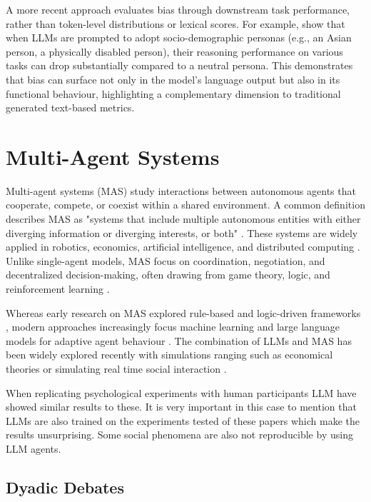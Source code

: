 A more recent approach evaluates bias through downstream task performance, rather than token-level distributions or lexical scores.  
For example, \citet{gupta2023bias} show that when LLMs are prompted to adopt socio-demographic personas (e.g., an Asian person, a physically disabled person), their reasoning performance on various tasks can drop substantially compared to a neutral persona. This demonstrates that bias can surface not only in the model’s language output but also in its functional behaviour, highlighting a complementary dimension to traditional generated text-based metrics.




\section{Multi-Agent Systems} 

Multi-agent systems (MAS) study interactions between autonomous agents that cooperate, compete, or coexist within a shared environment. A common definition describes MAS as "systems that include multiple autonomous entities with either diverging information or diverging interests, or both" \cite[p.xiii]{shoham2008multiagent}. These systems are widely applied in robotics, economics, artificial intelligence, and distributed computing \citep{wooldridge2009introduction}. Unlike single-agent models, MAS focus on coordination, negotiation, and decentralized decision-making, often drawing from game theory, logic, and reinforcement learning \citep{stone2010ad}.

Whereas early research on MAS explored rule-based and logic-driven frameworks \citep{shoham2008multiagent}, modern approaches increasingly focus machine learning and large language models for adaptive agent behaviour \citep{baker2019emergent}. The combination of LLMs and MAS has been widely explored recently with simulations ranging such as economical theories \citep{zhao2023competeai} or simulating real time social interaction \citep{kaiya2023lyfe}. 

When replicating psychological experiments with human participants LLM  have showed similar results \citep{cui2024can, aher2023using} to these. It is very important in this case to mention that LLMs are also trained on the experiments tested of these papers which make the results unsurprising. Some social phenomena are also not reproducible by using LLM agents. 

\subsection{Dyadic Debates}

